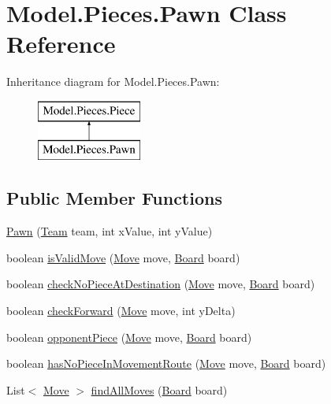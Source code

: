 \hypertarget{class_model_1_1_pieces_1_1_pawn}{}\section{Model.\+Pieces.\+Pawn Class Reference}
\label{class_model_1_1_pieces_1_1_pawn}
Inheritance diagram for Model.\+Pieces.\+Pawn\+:\begin{figure}[H]
\begin{center}
\leavevmode
\includegraphics[height=2.000000cm]{class_model_1_1_pieces_1_1_pawn}
\end{center}
\end{figure}
\subsection*{Public Member Functions}
\begin{DoxyCompactItemize}
\item 
\hyperlink{class_model_1_1_pieces_1_1_pawn_ad3d3d740e79b02e16c5cc4b2da2f25bf}{Pawn} (\hyperlink{class_model_1_1_team}{Team} team, int x\+Value, int y\+Value)
\item 
boolean \hyperlink{class_model_1_1_pieces_1_1_pawn_a8bb2d90244e6992f8c24108d2a8c13e7}{is\+Valid\+Move} (\hyperlink{class_model_1_1_move}{Move} move, \hyperlink{class_model_1_1_board}{Board} board)
\item 
boolean \hyperlink{class_model_1_1_pieces_1_1_pawn_aa344255a52a7a231c6580caf9c411c1d}{check\+No\+Piece\+At\+Destination} (\hyperlink{class_model_1_1_move}{Move} move, \hyperlink{class_model_1_1_board}{Board} board)
\item 
boolean \hyperlink{class_model_1_1_pieces_1_1_pawn_a1088583c9809266ccefc49ce8d272d24}{check\+Forward} (\hyperlink{class_model_1_1_move}{Move} move, int y\+Delta)
\item 
boolean \hyperlink{class_model_1_1_pieces_1_1_pawn_a130ca7b5f609a5caf2e76e782efc30c4}{opponent\+Piece} (\hyperlink{class_model_1_1_move}{Move} move, \hyperlink{class_model_1_1_board}{Board} board)
\item 
boolean \hyperlink{class_model_1_1_pieces_1_1_pawn_a051caa0213913b8c3748f47a5bdfcab6}{has\+No\+Piece\+In\+Movement\+Route} (\hyperlink{class_model_1_1_move}{Move} move, \hyperlink{class_model_1_1_board}{Board} board)
\item 
List$<$ \hyperlink{class_model_1_1_move}{Move} $>$ \hyperlink{class_model_1_1_pieces_1_1_pawn_a95dcb404b5207a813149c152d3a48a50}{find\+All\+Moves} (\hyperlink{class_model_1_1_board}{Board} board)
\end{DoxyCompactItemize}


